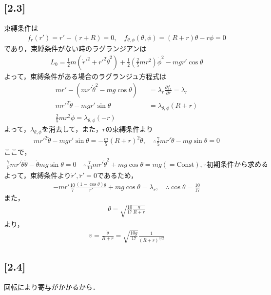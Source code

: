 \documentclass[12pt,dvipdfmx]{jsarticle}
\begin{document}
\subsection*{\large{[2.3]}}
束縛条件は
\begin{eqnarray}
  f_r(r') = r' - (r+R) = 0, \quad f_{\theta,\phi}(\theta,\phi) = (R+r)\theta -r\phi =0
\end{eqnarray}
であり，束縛条件がない時のラグランジアンは
\begin{eqnarray}
  L_0 = \frac{1}{2}m (\dot{r}'^2 + r'^2 \dot{\theta}^2) + \frac{1}{2}\left( \frac{2}{5}mr^2 \right)\dot{\phi}^2 - mgr' \cos\theta
\end{eqnarray}
よって，束縛条件がある場合のラグランジュ方程式は
\begin{eqnarray}
  m\ddot{r}' - ( mr'\dot{\theta}^2 -mg\cos\theta ) &&= \lambda_r \frac{\partial f_r}{\partial r} = \lambda_r\\
  mr'^2\ddot{\theta}-mgr'\sin\theta &&= \lambda_{\theta,\phi}(R+r)\\
  \frac{2}{5}mr^2 \ddot{\phi} = \lambda_{\theta,\phi}(-r)
\end{eqnarray}
よって，$\lambda_{\theta,\phi}$を消去して，また，$r$の束縛条件より
\begin{eqnarray}
  mr'^2\ddot{\theta}-mgr'\sin\theta = -\frac{m}{5}(R+r)^2 \ddot{\theta}, \quad\therefore \frac{7}{5}mr'\ddot{\theta}-mg\sin\theta =0
\end{eqnarray}
ここで，
\begin{eqnarray}
  \frac{7}{5}mr' \dot{\theta}\ddot{\theta} - \dot{\theta}mg\sin\theta = 0\quad\therefore \frac{7}{10}mr' \dot{\theta}^2 + mg\cos\theta =mg (=\text{Const}),\because 初期条件から求める
\end{eqnarray}
よって，束縛条件より$\dot{r}', \ddot{r}' =0$であるため，
\begin{eqnarray}
  -mr' \frac{10}{7}\frac{(1-\cos\theta)g}{r'} + mg\cos\theta = \lambda_r, \quad\therefore \cos\theta = \frac{10}{17}
\end{eqnarray}
また，
\begin{eqnarray}
  \dot{\theta} = \sqrt{ \frac{10}{17}\frac{g}{R+r} }
\end{eqnarray}
より，
\begin{eqnarray}
  v = \frac{\dot{\theta}}{R+r} = \sqrt{ \frac{10g}{17}}\frac{1}{(R+r)^{3/2}}
\end{eqnarray}
\subsection*{\large{[2.4]}}
回転により寄与がかかるから．
\end{document}
